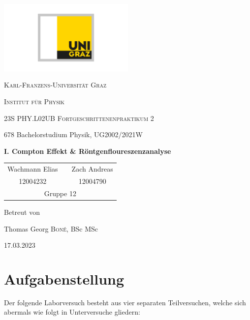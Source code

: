 \documentclass[ngerman]{scrartcl}
\begin{document}
\begin{titlepage}
    \centering
    \includegraphics[width=0.5\textwidth]{../../99_Misc/Logo_KF.pdf}\par\vspace{0.8cm}
    {\scshape\LARGE{Karl-Franzens-Universität Graz}\par}
    {\scshape\LARGE{Institut für Physik}\par}
    \vspace{1cm}
    {\scshape\Large{23S PHY.L02UB Fortgeschrittenenpraktikum 2}\par}
    678 Bachelorstudium Physik, UG2002/2021W\par
    \vspace{1.5cm}
    {\huge\bfseries I. Compton Effekt \& Röntgenfloureszenzanalyse\par}
    \vspace{2cm}
    \begin{table}[H]
        \centering
        \begin{tabular}{c c c}
            \Large Wachmann Elias &  & \Large Zach Andreas \\
            \Large 12004232       &  & \Large 12004790     \\
            \multicolumn{3}{c}{Gruppe 12}
        \end{tabular}
    \end{table}
    \vfill
    \Large Betreut von\par
    Thomas Georg \textsc{Boné}, BSc MSc
    \vfill
    {\large 17.03.2023\par}
\end{titlepage}

\clearpage
\tableofcontents
\newpage

\section[Aufgabenstellung]{Aufgabenstellung \cite{ref:angabe}}
\label{sec:aufgabenstellung}

Der folgende Laborversuch besteht aus vier separaten Teilversuchen, welche sich abermals wie folgt in Unterversuche gliedern:
\end{document}

